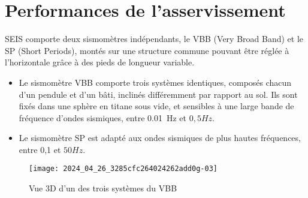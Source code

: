 %
%

\section{Performances de l'asservissement}
\ifprof
\else
SEIS comporte deux sismomètres indépendants, le VBB (Very Broad Band) et le SP (Short Periods), montés sur une structure commune pouvant être réglée à l'horizontale grâce à des pieds de longueur variable.

\begin{itemize}
  \item Le sismomètre VBB comporte trois systèmes identiques, composés chacun d'un pendule et d'un bâti, inclinés différemment par rapport au sol. Ils sont fixés dans une sphère en titane sous vide, et sensibles à une large bande de fréquence d'ondes sismiques, entre \SI{0,01}{Hz} et $0,5 \si{Hz}$.
  \item Le sismomètre SP est adapté aux ondes sismiques de plus hautes fréquences, entre 0,1 et $50 \si{Hz}$.
\end{itemize}

\begin{figure}[!h]
\centering
\texttt{[image: 2024\_04\_26\_3285cfc264024262add0g-03]}
\caption{\label{ccmp2023_fig_02} Vue 3D d'un des trois systèmes du VBB}
\end{figure}


